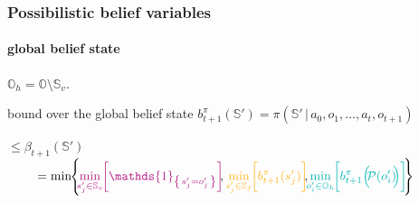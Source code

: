 \documentclass[12pt,svgnames,table]{beamer}
\newcommand{\paren}[1]{\left( \left. #1 \right. \right)}
\newcommand{\set}[1]{\left\{ \left. #1 \right. \right\}}
\newcommand{\sachant}{\, \right| \left. \,}
\begin{document}
\begin{frame}
\frametitle{Possibilistic belief variables}
\framesubtitle{\footnotesize global belief state}
$\mathbb{O}_h = \mathbb{O} \setminus \mathbb{S}_v$.
\begin{block}{bound over the global belief state}
$b^{\pi}_{t+1}(\mathbb{S}') = \pi \paren{ \mathbb{S}' \sachant a_0,o_1, \ldots, a_{t},o_{t+1} } $
\end{block}
$ \leqslant \beta_{t+1}(\mathbb{S}')$\\
$\hspace{0.8cm} \displaystyle = \min \hspace{-0.1cm} \Bigg\{ \hspace{-0.1cm} 
{\color{violet} \min_{s_j' \in \mathbb{S}_v} \hspace{-0.1cm} \bigg[ \mathds{1}_{ \set{s_j'=o_j'}} \bigg]} \hspace{-0.1cm}, 
{\color{orangee} \min_{s_j' \in \mathbb{S}_f} \hspace{-0.1cm} \bigg[ b^{\pi}_{t+1}(s_j') \bigg]} \hspace{-0.1cm} , \hspace{-0.1cm} 
{\color{gggreen} \min_{o_i' \in \mathbb{O}_h} \hspace{-0.1cm} \bigg[ b_{t+1}^{\pi} \Big( \hspace{-0.1cm} \mathcal{P}(o_i') 
\hspace{-0.1cm} \Big) \bigg]} \hspace{-0.1cm}  \Bigg\} \hspace{-0.3cm}$\\
\end{frame}
\end{document}
